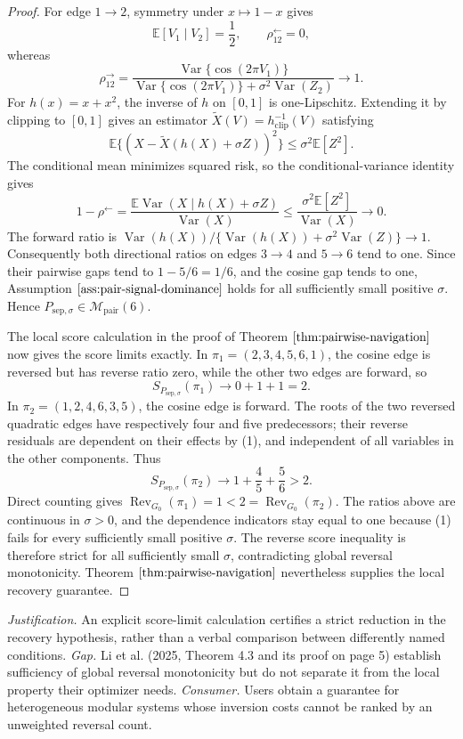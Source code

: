 \documentclass{article}
\begin{document}
\begin{proof}
For edge \(1\to2\), symmetry under \(x\mapsto1-x\) gives
\[
 \mathbb E[V_1\mid V_2]=\frac12,
 \qquad \rho^{\leftarrow}_{12}=0,
\]
whereas
\[
 \rho^{\to}_{12}
 =\frac{\operatorname{Var}\{\cos(2\pi V_1)\}}
 {\operatorname{Var}\{\cos(2\pi V_1)\}+\sigma^2\operatorname{Var}(Z_2)}
 \longrightarrow1.
\]
For \(h(x)=x+x^2\), the inverse of \(h\) on \([0,1]\) is one-Lipschitz.  Extending it by clipping to \([0,1]\) gives an estimator \(\widetilde X(V)=h^{-1}_{\mathrm{clip}}(V)\) satisfying
\[
 \mathbb E\{(X-\widetilde X(h(X)+\sigma Z))^2\}
 \le \sigma^2\mathbb E[Z^2].
\]
The conditional mean minimizes squared risk, so the conditional-variance identity gives
\[
 1-\rho^{\leftarrow}
 =\frac{\mathbb E\operatorname{Var}(X\mid h(X)+\sigma Z)}{\operatorname{Var}(X)}
 \le\frac{\sigma^2\mathbb E[Z^2]}{\operatorname{Var}(X)}\longrightarrow0.
\]
The forward ratio is \(\operatorname{Var}(h(X))/\{\operatorname{Var}(h(X))+\sigma^2\operatorname{Var}(Z)\}\to1\).  Consequently both directional ratios on edges \(3\to4\) and \(5\to6\) tend to one.  Since their pairwise gaps tend to \(1-5/6=1/6\), and the cosine gap tends to one, Assumption \(\ref{ass:pair-signal-dominance}\) holds for all sufficiently small positive \(\sigma\).  Hence \(P_{\mathrm{sep},\sigma}\in\mathcal M_{\mathrm{pair}}(6)\).

The local score calculation in the proof of Theorem \(\ref{thm:pairwise-navigation}\) now gives the score limits exactly.  In \(\pi_1=(2,3,4,5,6,1)\), the cosine edge is reversed but has reverse ratio zero, while the other two edges are forward, so
\[
 S_{P_{\mathrm{sep},\sigma}}(\pi_1)\longrightarrow 0+1+1=2.
\]
In \(\pi_2=(1,2,4,6,3,5)\), the cosine edge is forward.  The roots of the two reversed quadratic edges have respectively four and five predecessors; their reverse residuals are dependent on their effects by (1), and independent of all variables in the other components.  Thus
\[
 S_{P_{\mathrm{sep},\sigma}}(\pi_2)\longrightarrow
 1+\frac45+\frac56>2.
\]
Direct counting gives \(\operatorname{Rev}_{G_0}(\pi_1)=1<2=\operatorname{Rev}_{G_0}(\pi_2)\).  The ratios above are continuous in \(\sigma>0\), and the dependence indicators stay equal to one because (1) fails for every sufficiently small positive \(\sigma\).  The reverse score inequality is therefore strict for all sufficiently small \(\sigma\), contradicting global reversal monotonicity.  Theorem \(\ref{thm:pairwise-navigation}\) nevertheless supplies the local recovery guarantee.
\end{proof}
\par\smallskip\noindent \textit{Justification.} An explicit score-limit calculation certifies a strict reduction in the recovery hypothesis, rather than a verbal comparison between differently named conditions. \textit{Gap.} Li et al. (2025, Theorem 4.3 and its proof on page 5) establish sufficiency of global reversal monotonicity but do not separate it from the local property their optimizer needs. \textit{Consumer.} Users obtain a guarantee for heterogeneous modular systems whose inversion costs cannot be ranked by an unweighted reversal count.
\end{document}

